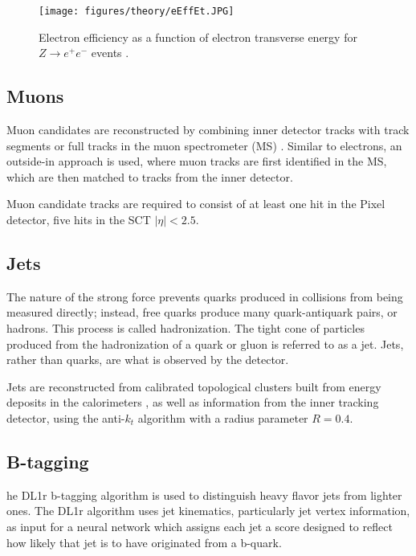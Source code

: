 \begin{figure}[H]
\centering
   \texttt{[image: figures/theory/eEffEt.JPG]}
\caption{Electron efficiency as a function of electron transverse energy for $Z\rightarrow e^+e^-$ events \cite{tagAndProbe}.}
\label{fig:eEffEt}
\end{figure}

\subsection{Muons}
                   
Muon candidates are reconstructed by combining inner detector tracks with track segments or full tracks in the muon spectrometer (MS) \cite{PERF-2014-05}. Similar to electrons, an outside-in approach is used, where muon tracks are first identified in the MS, which are then matched to tracks from the inner detector.

Muon candidate tracks are required to consist of at least one hit in the Pixel detector, five hits in the SCT $|\eta| < 2.5$. 

\subsection{Jets}
\label{subsec:jets}

The nature of the strong force prevents quarks produced in collisions from being measured directly; instead, free quarks produce many quark-antiquark pairs, or hadrons. This process is called hadronization. The tight cone of particles produced from the hadronization of a quark or gluon is referred to as a jet. Jets, rather than quarks, are what is observed by the detector.

Jets are reconstructed from calibrated topological clusters built from energy deposits in the calorimeters \cite{ATL-PHYS-PUB-2015-015}, as well as information from the inner tracking detector, using the anti-$k_t$ algorithm with a radius parameter $R=0.4$. 

\subsection{B-tagging}
\label{subsec:bjets}

he DL1r b-tagging algorithm is used to distinguish heavy flavor jets from lighter ones. The DL1r algorithm \cite{btag_cal} uses jet kinematics, particularly jet vertex information, as input for a neural network which assigns each jet a score designed to reflect how likely that jet is to have originated from a b-quark. 

